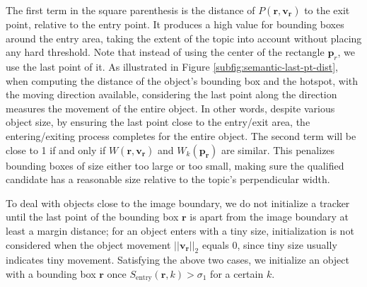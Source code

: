     The first term in the square parenthesis is the distance of $P(\bm{r}, \bm{v_r})$ to the exit point, relative to the entry point. It produces a high value for bounding boxes around the entry area, taking the extent of the topic into account without placing any hard threshold. 
    Note that instead of using the center of the rectangle $\bm{p}_{r}$, we use the last point of it. 
    As illustrated in Figure \ref{subfig:semantic-last-pt-dist}, when computing the distance of the object's bounding box and the hotspot, with the moving direction available, considering the last point along the direction measures the movement of the entire object. In other words, despite various object size, by ensuring the last point close to the entry/exit area, the entering/exiting process completes for the entire object.
    The second term will be close to 1 if and only if $W(\bm{r}, \bm{v_r})$ and $W_k(\bm{p_r})$ are similar.
    This penalizes bounding boxes of size either too large or too small, making sure the qualified candidate has a reasonable size relative to the topic's perpendicular width. 



    To deal with objects close to the image boundary, we do not initialize a tracker until the last point of the bounding box $\bm{r}$ is apart from the image boundary at least a margin distance; for an object enters with a tiny size, initialization is not considered when the object movement $||\bm{v_r}||_2$ equals $0$, since tiny size usually indicates tiny movement.
    Satisfying the above two cases, we initialize an object with a bounding box $\bm{r}$ once $S_{\text{entry}}(\bm{r}, k) > \sigma_{1}$ for a certain $k$. 

